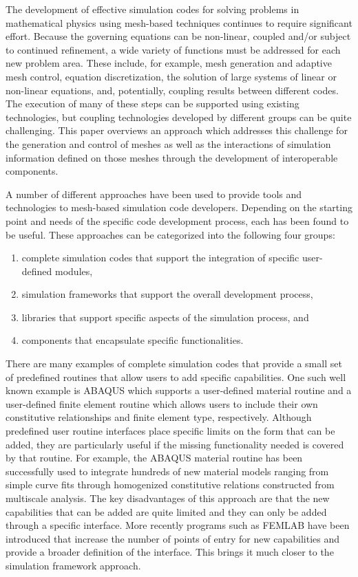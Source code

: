 The development of effective simulation codes for solving problems in
mathematical physics using mesh-based techniques continues to require
significant effort.  Because the governing equations can be
non-linear, coupled and/or subject to continued refinement, a wide
variety of functions must be addressed for each new problem area.
These include, for example, mesh generation and adaptive mesh control,
equation discretization, the solution of large systems of linear or
non-linear equations, and, potentially, coupling results between
different codes. The execution of many of these steps can be supported
using existing technologies, but coupling technologies developed by
different groups can be quite challenging.  This paper overviews an
approach which addresses this challenge for the generation and control
of meshes as well as the interactions of simulation information
defined on those meshes through the development of interoperable
components.

A number of different approaches have been used to provide tools and
technologies to mesh-based simulation code developers. Depending on
the starting point and needs of the specific code development process,
each has been found to be useful. These approaches can be categorized
into the following four groups:

\begin{enumerate}
\item complete simulation codes that support the integration of specific
      user-defined modules,
\item simulation frameworks that support the overall development process,
\item libraries that support specific aspects of the simulation
      process, and
\item components that encapsulate specific functionalities.
\end{enumerate}

There are many examples of complete simulation codes that provide a
small set of predefined routines that allow users to add specific
capabilities. One such well known example is ABAQUS \cite{abaqus}
which supports a user-defined material routine and a user-defined
finite element routine which allows users to include their own
constitutive relationships and finite element type,
respectively. Although predefined user routine interfaces place
specific limits on the form that can be added, they are particularly
useful if the missing functionality needed is covered by that
routine. For example, the ABAQUS material routine has been
successfully used to integrate hundreds of new material models ranging
from simple curve fits through homogenized constitutive relations
constructed from multiscale analysis.  The key disadvantages of this
approach are that the new capabilities that can be added are quite
limited and they can only be added through a specific interface. More
recently programs such as FEMLAB \cite{femlab} have been introduced
that increase the number of points of entry for new capabilities and
provide a broader definition of the interface.  This brings it much
closer to the simulation framework approach.

